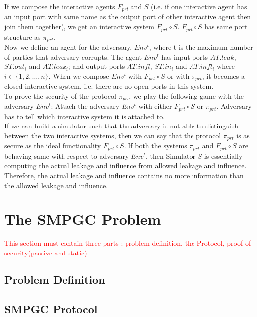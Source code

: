 \documentclass{llncs}
\begin{document}
\begin{itemize}
If we compose the interactive agents $ F_{prt} $ and $ S $ (i.e. if one interactive agent has an input port with same name as the output port of other interactive agent then join them together), we get an interactive system $ F_{prt} \circ S $. $ F_{prt} \circ S $ has same port structure as $ \pi_{prt} $.\\
Now we define an agent for the adversary, $Env^t$, where t is the maximum number of parties that adversary corrupts. The agent $Env^t$ has input ports $ AT.leak $, $ ST.out_i $ and $ AT.leak_i $; and output ports $ AT.infl $, $ ST.in_i $ and $ AT.infl_i $ where $ i\in \{1,2,\dots,n\} $. When we compose $Env^t$ with $ F_{prt} \circ S $ or with $ \pi_{prt} $, it becomes a closed interactive system, i.e. there are no open ports in this system.\\
To prove the security of the protocol $ \pi_{prt} $, we play the following game with the adversary $ Env^t $: Attach the adversary $ Env^t $ with either $ F_{prt} \circ S $ or $ \pi_{prt} $. Adversary has to tell which interactive system it is attached to.\\
If we can build a simulator such that the adversary is not able to distinguish between the two interactive systems, then we can say that the protocol $ \pi_{prt} $ is as secure as the ideal functionality $ F_{prt} \circ S $. If both the systems $ \pi_{prt} $ and $ F_{prt} \circ S $ are behaving same with respect to adversary $ Env^t $, then Simulator $ S $ is essentially computing the actual leakage and influence from allowed leakage and influence. Therefore, the actual leakage and influence contains no more information than the allowed leakage and influence.
\end{itemize}

\section{The SMPGC Problem}

\textcolor{red}{This section must contain three parts : problem definition, the Protocol, proof of security(passive and static)  
} 
\subsection{Problem Definition}

\subsection{SMPGC Protocol}
\end{document}
